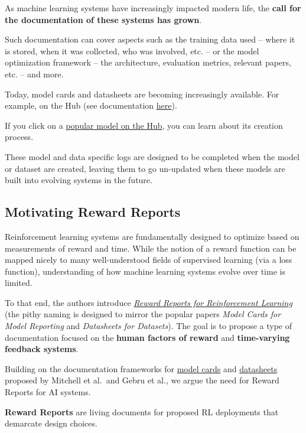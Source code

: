 \documentclass[11pt,a4paper]{article}
\begin{document}
As machine learning systems have increasingly impacted modern life, the \textbf{call for the documentation of these systems has grown}.

Such documentation can cover aspects such as the training data used -- where it is stored, when it was collected, who was involved, etc. -- or the model optimization framework -- the architecture, evaluation metrics, relevant papers, etc. -- and more.

Today, model cards and datasheets are becoming increasingly available. For example, on the Hub (see documentation \href{https://huggingface.co/docs/hub/model-cards}{here}).

If you click on a \href{https://huggingface.co/models}{popular model on the Hub}, you can learn about its creation process.

These model and data specific logs are designed to be completed when the model or dataset are created, leaving them to go un-updated when these models are built into evolving systems in the future.

\subsection{Motivating Reward Reports}\label{motivating-reward-reports}

Reinforcement learning systems are fundamentally designed to optimize based on measurements of reward and time. While the notion of a reward function can be mapped nicely to many well-understood fields of supervised learning (via a loss function), understanding of how machine learning systems evolve over time is limited.

To that end, the authors introduce \href{https://www.notion.so/Brief-introduction-to-RL-documentation-b8cbda5a6f5242338e0756e6bef72af4}{\emph{Reward Reports for Reinforcement Learning}} (the pithy naming is designed to mirror the popular papers \emph{Model Cards for Model Reporting} and \emph{Datasheets for Datasets}). The goal is to propose a type of documentation focused on the \textbf{human factors of reward} and \textbf{time-varying feedback systems}.

Building on the documentation frameworks for \href{https://arxiv.org/abs/1810.03993}{model cards} and \href{https://arxiv.org/abs/1803.09010}{datasheets} proposed by Mitchell et al.~and Gebru et al., we argue the need for Reward Reports for AI systems.

\textbf{Reward Reports} are living documents for proposed RL deployments that demarcate design choices.
\end{document}
